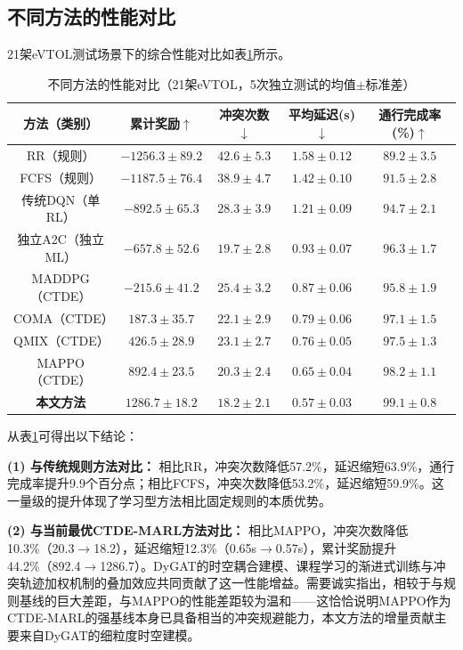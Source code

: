 \documentclass[12pt,a4paper,UTF8]{ctexart}
\begin{document}
\subsection{不同方法的性能对比}

21架eVTOL测试场景下的综合性能对比如表\ref{tab:comparison}所示。

\begin{table}[H]
    \centering
    \caption{不同方法的性能对比（21架eVTOL，5次独立测试的均值$\pm$标准差）}
    \label{tab:comparison}
    \begin{tabular}{|c|c|c|c|c|}
        \hline
        \textbf{方法（类别）} & \textbf{累计奖励$\uparrow$} & \textbf{冲突次数$\downarrow$} & \textbf{平均延迟(s)$\downarrow$} & \textbf{通行完成率(\%)$\uparrow$} \\
        \hline
        RR（规则） & $-1256.3 \pm 89.2$ & $42.6 \pm 5.3$ & $1.58 \pm 0.12$ & $89.2 \pm 3.5$ \\
        FCFS（规则） & $-1187.5 \pm 76.4$ & $38.9 \pm 4.7$ & $1.42 \pm 0.10$ & $91.5 \pm 2.8$ \\
        传统DQN（单RL） & $-892.5 \pm 65.3$ & $28.3 \pm 3.9$ & $1.21 \pm 0.09$ & $94.7 \pm 2.1$ \\
        独立A2C（独立ML） & $-657.8 \pm 52.6$ & $19.7 \pm 2.8$ & $0.93 \pm 0.07$ & $96.3 \pm 1.7$ \\
        MADDPG（CTDE） & $-215.6 \pm 41.2$ & $25.4 \pm 3.2$ & $0.87 \pm 0.06$ & $95.8 \pm 1.9$ \\
        COMA（CTDE） & $187.3 \pm 35.7$ & $22.1 \pm 2.9$ & $0.79 \pm 0.06$ & $97.1 \pm 1.5$ \\
        QMIX（CTDE） & $426.5 \pm 28.9$ & $23.1 \pm 2.7$ & $0.76 \pm 0.05$ & $97.5 \pm 1.3$ \\
        MAPPO（CTDE） & $892.4 \pm 23.5$ & $20.3 \pm 2.4$ & $0.65 \pm 0.04$ & $98.2 \pm 1.1$ \\
        \textbf{本文方法} & $\mathbf{1286.7 \pm 18.2}$ & $\mathbf{18.2 \pm 2.1}$ & $\mathbf{0.57 \pm 0.03}$ & $\mathbf{99.1 \pm 0.8}$ \\
        \hline
    \end{tabular}
\end{table}

从表\ref{tab:comparison}可得出以下结论：

\textbf{(1) 与传统规则方法对比：} 相比RR，冲突次数降低57.2\%，延迟缩短63.9\%，通行完成率提升9.9个百分点；相比FCFS，冲突次数降低53.2\%，延迟缩短59.9\%。这一量级的提升体现了学习型方法相比固定规则的本质优势。

\textbf{(2) 与当前最优CTDE-MARL方法对比：} 相比MAPPO，冲突次数降低10.3\%（20.3$\to$18.2），延迟缩短12.3\%（0.65s$\to$0.57s），累计奖励提升44.2\%（892.4$\to$1286.7）。DyGAT的时空耦合建模、课程学习的渐进式训练与冲突轨迹加权机制的叠加效应共同贡献了这一性能增益。需要诚实指出，相较于与规则基线的巨大差距，与MAPPO的性能差距较为温和——这恰恰说明MAPPO作为CTDE-MARL的强基线本身已具备相当的冲突规避能力，本文方法的增量贡献主要来自DyGAT的细粒度时空建模。
\end{document}

